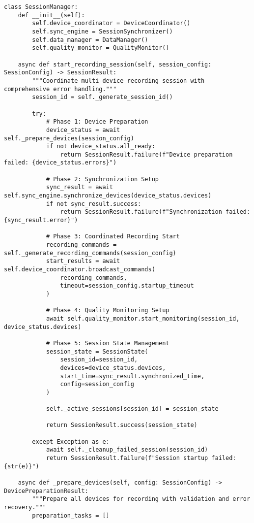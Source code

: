 \documentclass[12pt,a4paper]{article}
\begin{document}
\begin{verbatim}
class SessionManager:
    def __init__(self):
        self.device_coordinator = DeviceCoordinator()
        self.sync_engine = SessionSynchronizer()
        self.data_manager = DataManager()
        self.quality_monitor = QualityMonitor()

    async def start_recording_session(self, session_config: SessionConfig) -> SessionResult:
        """Coordinate multi-device recording session with comprehensive error handling."""
        session_id = self._generate_session_id()

        try:
            # Phase 1: Device Preparation
            device_status = await self._prepare_devices(session_config)
            if not device_status.all_ready:
                return SessionResult.failure(f"Device preparation failed: {device_status.errors}")

            # Phase 2: Synchronization Setup
            sync_result = await self.sync_engine.synchronize_devices(device_status.devices)
            if not sync_result.success:
                return SessionResult.failure(f"Synchronization failed: {sync_result.error}")

            # Phase 3: Coordinated Recording Start
            recording_commands = self._generate_recording_commands(session_config)
            start_results = await self.device_coordinator.broadcast_commands(
                recording_commands,
                timeout=session_config.startup_timeout
            )

            # Phase 4: Quality Monitoring Setup
            await self.quality_monitor.start_monitoring(session_id, device_status.devices)

            # Phase 5: Session State Management
            session_state = SessionState(
                session_id=session_id,
                devices=device_status.devices,
                start_time=sync_result.synchronized_time,
                config=session_config
            )

            self._active_sessions[session_id] = session_state

            return SessionResult.success(session_state)

        except Exception as e:
            await self._cleanup_failed_session(session_id)
            return SessionResult.failure(f"Session startup failed: {str(e)}")

    async def _prepare_devices(self, config: SessionConfig) -> DevicePreparationResult:
        """Prepare all devices for recording with validation and error recovery."""
        preparation_tasks = []


\end{verbatim}
\end{document}
